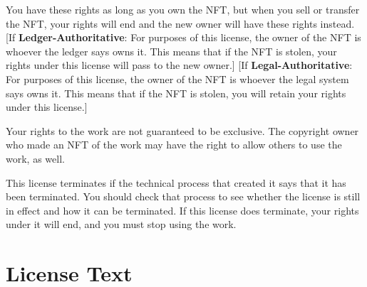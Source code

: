 \documentclass{article}
\newcommand{\keyword}[1]{\textbf{#1}\xspace}
\newcommand{\ledger}{\keyword{Ledger-Authoritative}}
\newcommand{\legal}{\keyword{Legal-Authoritative}}
\begin{document}
You have these rights as long as you own the NFT, but when you sell or transfer the NFT, your rights will end and the new owner will have these rights instead. [If \ledger: For purposes of this license, the owner of the NFT is whoever the ledger says owns it. This means that if the NFT is stolen, your rights under this license will pass to the new owner.] [If \legal: For purposes of this license, the owner of the NFT is whoever the legal system says owns it. This means that if the NFT is stolen, you will retain your rights under this license.]

Your rights to the work are not guaranteed to be exclusive. The copyright owner who made an NFT of the work may have the right to allow others to use the work, as well.

This license terminates if the technical process that created it says that it has been terminated. You should check that process to see whether the license is still in effect and how it can be terminated. If this license does terminate, your rights under it will end, and you must stop using the work.


\section{License Text}
\label{sec:text}
\end{document}
